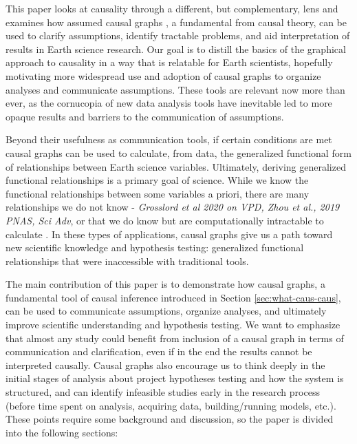 \documentclass[12pt]{article}
\begin{document}
This paper looks at causality through a different, but complementary,
lens and examines how assumed causal graphs \citep{pearl1995causal}, a
fundamental from causal theory, can be used to clarify assumptions,
identify tractable problems, and aid interpretation of results in
Earth science research. Our goal is to distill \citep{olah2017} the
basics of the graphical approach to causality in a way that is
relatable for Earth scientists, hopefully motivating more widespread
use and adoption of causal graphs to organize analyses and communicate
assumptions. These tools are relevant now more than ever, as the
cornucopia of new data analysis tools have inevitable led to more
opaque results and barriers to the communication of assumptions.

Beyond their usefulness as communication tools, if certain conditions
are met causal graphs can be used to calculate, from data, the
generalized functional form of relationships between Earth science
variables. Ultimately, deriving generalized functional relationships
is a primary goal of science. While we know the functional
relationships between some variables a priori, there are many
relationships we do not know \citep[e.g., ecosystem scale water and
carbon fluxes;][]{massmann2019} - \textit{Grosslord et al 2020 on VPD,
  Zhou et al., 2019 PNAS, Sci Adv}, or that we do know but are
computationally intractable to calculate \citep[e.g., clouds and
microphysics at the global scale:][]{randall2003, gentine2018,
  zadra2018}. In these types of applications, causal graphs give us a
path toward new scientific knowledge and hypothesis testing:
generalized functional relationships that were inaccessible with
traditional tools.

The main contribution of this paper is to demonstrate how causal
graphs, a fundamental tool of causal inference introduced in Section
\ref{sec:what-caus-caus}, can be used to communicate assumptions,
organize analyses, and ultimately improve scientific understanding and
hypothesis testing. We want to emphasize that almost any study could
benefit from inclusion of a causal graph in terms of communication and
clarification, even if in the end the results cannot be interpreted
causally. Causal graphs also encourage us to think deeply in the
initial stages of analysis about project hypotheses testing and how
the system is structured, and can identify infeasible studies early in
the research process (before time spent on analysis, acquiring data,
building/running models, etc.). These points require some background
and discussion, so the paper is divided into the following sections:
\end{document}
